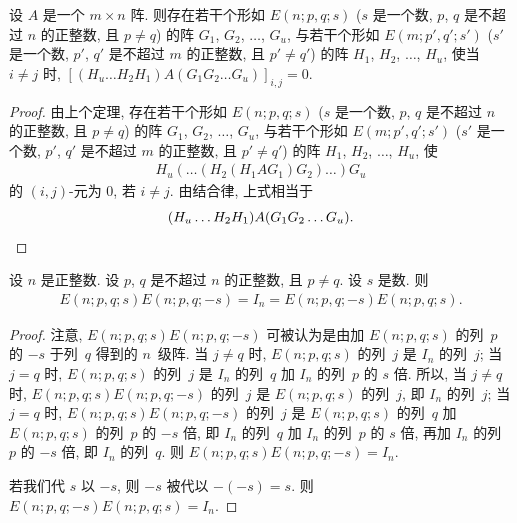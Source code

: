\documentclass[../libro.tex]{subfiles}
\begin{document}
\begin{theorem}
    设 \(A\) 是一个 \(m \times n\) 阵.
    则存在若干个形如 \(E(n; p, q; s)\)
    (\(s\) 是一个数, %
    \(p\), \(q\) 是不超过 \(n\) 的正整数,
    且 \(p \neq q\)) %
    的阵
    \(G_1\), \(G_2\), \(\dots\), \(G_u\),
    与若干个形如 \(E(m; p', q'; s')\)
    (\(s'\) 是一个数, %
    \(p'\), \(q'\) 是不超过 \(m\) 的正整数,
    且 \(p' \neq q'\)) %
    的阵
    \(H_1\), \(H_2\), \(\dots\), \(H_u\),
    使当 \(i \neq j\) 时,
    \([(H_u \dots H_2 H_1) A (G_1 G_2 \dots G_u)]_{i,j} = 0\).
\end{theorem}

\begin{proof}
    由上个定理,
    存在若干个形如 \(E(n; p, q; s)\)
    (\(s\) 是一个数, %
    \(p\), \(q\) 是不超过 \(n\) 的正整数,
    且 \(p \neq q\)) %
    的阵
    \(G_1\), \(G_2\), \(\dots\), \(G_u\),
    与若干个形如 \(E(m; p', q'; s')\)
    (\(s'\) 是一个数, %
    \(p'\), \(q'\) 是不超过 \(m\) 的正整数,
    且 \(p' \neq q'\)) %
    的阵
    \(H_1\), \(H_2\), \(\dots\), \(H_u\),
    使
    \begin{align*}
        H_u (\dots (H_2 (H_1 A G_1) G_2) \dots) G_u
    \end{align*}
    的 \((i, j)\)-元为 \(0\), 若 \(i \neq j\).
    由结合律, 上式相当于
    \begin{equation*}
        (H_u \dots H_2 H_1) A (G_1 G_2 \dots G_u).
        \qedhere
    \end{equation*}
\end{proof}

\begin{theorem}
    设 \(n\) 是正整数.
    设 \(p\), \(q\) 是不超过 \(n\) 的正整数, 且 \(p \neq q\).
    设 \(s\) 是数.
    则
    \begin{align*}
        E(n; p, q; s) E(n; p, q; -s)
        = I_n
        = E(n; p, q; -s) E(n; p, q; s).
    \end{align*}
\end{theorem}

\begin{proof}
    注意, \(E(n; p, q; s) E(n; p, q; -s)\) 可被认为是由加
    \(E(n; p, q; s)\) 的列~\(p\) 的 \(-s\) 于列~\(q\) 得到的 \(n\)~级阵.
    当 \(j \neq q\) 时, \(E(n; p, q; s)\) 的列~\(j\) 是 \(I_n\) 的列~\(j\);
    当 \(j = q\) 时, \(E(n; p, q; s)\) 的列~\(j\) 是
    \(I_n\) 的列~\(q\) 加 \(I_n\) 的列~\(p\) 的 \(s\) 倍.
    所以, 当 \(j \neq q\) 时,
    \(E(n; p, q; s) E(n; p, q; -s)\) 的列~\(j\) 是
    \(E(n; p, q; s)\) 的列~\(j\),
    即 \(I_n\) 的列~\(j\);
    当 \(j = q\) 时,
    \(E(n; p, q; s) E(n; p, q; -s)\) 的列~\(j\) 是
    \(E(n; p, q; s)\) 的列~\(q\)
    加 \(E(n; p, q; s)\) 的列~\(p\) 的 \(-s\) 倍,
    即 \(I_n\) 的列~\(q\) 加 \(I_n\) 的列~\(p\) 的 \(s\) 倍,
    再加 \(I_n\) 的列~\(p\) 的 \(-s\) 倍,
    即 \(I_n\) 的列~\(q\).
    则 \(E(n; p, q; s) E(n; p, q; -s) = I_n\).

    若我们代 \(s\) 以 \(-s\),
    则 \(-s\) 被代以 \(-(-s) = s\).
    则 \(E(n; p, q; -s) E(n; p, q; s) = I_n\).
\end{proof}
\end{document}
